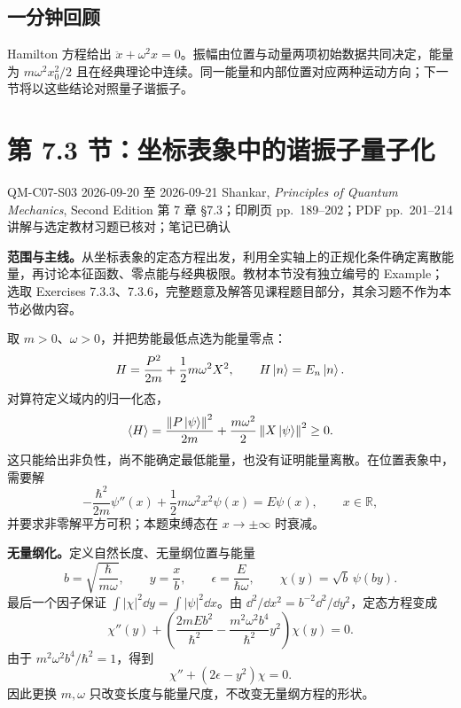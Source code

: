 \subsection{一分钟回顾}
Hamilton 方程给出 $\ddot x+\omega^2x=0$。振幅由位置与动量两项初始数据共同决定，能量为 $m\omega^2x_0^2/2$ 且在经典理论中连续。同一能量和内部位置对应两种运动方向；下一节将以这些结论对照量子谐振子。

\section{第 7.3 节：坐标表象中的谐振子量子化}
\label{section:QM-C07-S03}
\studymeta
  {QM-C07-S03}
  {2026-09-20 至 2026-09-21}
  {Shankar, \textit{Principles of Quantum Mechanics}, Second Edition}
  {第 7 章 \S 7.3；印刷页 pp.~189--202；PDF pp.~201--214}
  {讲解与选定教材习题已核对；笔记已确认}

\textbf{范围与主线。}从坐标表象的定态方程出发，利用全实轴上的正规化条件确定离散能量，再讨论本征函数、零点能与经典极限。教材本节没有独立编号的 Example；选取 Exercises 7.3.3、7.3.6，完整题意及解答见课程题目部分，其余习题不作为本节必做内容。

取 $m>0$、$\omega>0$，并把势能最低点选为能量零点：
\begin{equation}
  H=\frac{P^2}{2m}+\frac12m\omega^2X^2,
  \qquad H\left|n\right\rangle=E_n\left|n\right\rangle.
\end{equation}
对算符定义域内的归一化态，
\begin{equation}
  \left\langle H \right\rangle=\frac{\left\lVert P\left|\psi\right\rangle \right\rVert^2}{2m}
            +\frac{m\omega^2}{2}\left\lVert X\left|\psi\right\rangle \right\rVert^2\ge0.
\end{equation}
这只能给出非负性，尚不能确定最低能量，也没有证明能量离散。在位置表象中，需要解
\begin{equation}
  -\frac{\hbar^2}{2m}\psi''(x)+\frac12m\omega^2x^2\psi(x)
  =E\psi(x),\qquad x\in\mathbb R,
  \label{eq:QM-C07-S03-eigen-ode}
\end{equation}
并要求非零解平方可积；本题束缚态在 $x\to\pm\infty$ 时衰减。

\textbf{无量纲化。}定义自然长度、无量纲位置与能量
\begin{equation}
  b=\sqrt{\frac{\hbar}{m\omega}},\qquad
  y=\frac{x}{b},\qquad \epsilon=\frac{E}{\hbar\omega},
  \qquad \chi(y)=\sqrt b\,\psi(by).
\end{equation}
最后一个因子保证 $\int|\chi|^2\dd y=\int|\psi|^2\dd x$。由
$\dd^2/\dd x^2=b^{-2}\dd^2/\dd y^2$，定态方程变成
\begin{equation}
  \chi''(y)+\left(\frac{2mEb^2}{\hbar^2}
     -\frac{m^2\omega^2b^4}{\hbar^2}y^2\right)\chi(y)=0.
\end{equation}
由于 $m^2\omega^2b^4/\hbar^2=1$，得到
\begin{equation}
  \boxed{\chi''+(2\epsilon-y^2)\chi=0}.
  \label{eq:QM-C07-S03-dimensionless}
\end{equation}
因此更换 $m,\omega$ 只改变长度与能量尺度，不改变无量纲方程的形状。

